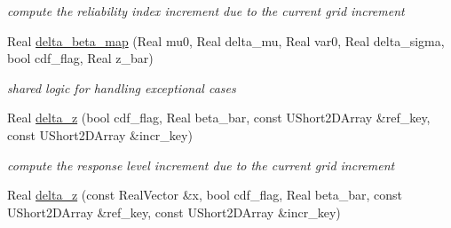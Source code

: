 \begin{DoxyCompactItemize}
\begin{DoxyCompactList}\small\item\em compute the reliability index increment due to the current grid increment \end{DoxyCompactList}\item 
Real \hyperlink{classPecos_1_1HierarchInterpPolyApproximation_aa98a30aa3967a620f7adeda20f3ebbeb}{delta\+\_\+beta\+\_\+map} (Real mu0, Real delta\+\_\+mu, Real var0, Real delta\+\_\+sigma, bool cdf\+\_\+flag, Real z\+\_\+bar)\label{classPecos_1_1HierarchInterpPolyApproximation_aa98a30aa3967a620f7adeda20f3ebbeb}

\begin{DoxyCompactList}\small\item\em shared logic for handling exceptional cases \end{DoxyCompactList}\item 
Real \hyperlink{classPecos_1_1HierarchInterpPolyApproximation_a0cbb05caf7c944d49bff491d393a4236}{delta\+\_\+z} (bool cdf\+\_\+flag, Real beta\+\_\+bar, const U\+Short2\+D\+Array \&ref\+\_\+key, const U\+Short2\+D\+Array \&incr\+\_\+key)\label{classPecos_1_1HierarchInterpPolyApproximation_a0cbb05caf7c944d49bff491d393a4236}

\begin{DoxyCompactList}\small\item\em compute the response level increment due to the current grid increment \end{DoxyCompactList}\item 
Real \hyperlink{classPecos_1_1HierarchInterpPolyApproximation_a0a9f4f936740e46b517449a7e935bb2b}{delta\+\_\+z} (const Real\+Vector \&x, bool cdf\+\_\+flag, Real beta\+\_\+bar, const U\+Short2\+D\+Array \&ref\+\_\+key, const U\+Short2\+D\+Array \&incr\+\_\+key)\label{classPecos_1_1HierarchInterpPolyApproximation_a0a9f4f936740e46b517449a7e935bb2b}


\end{DoxyCompactItemize}
